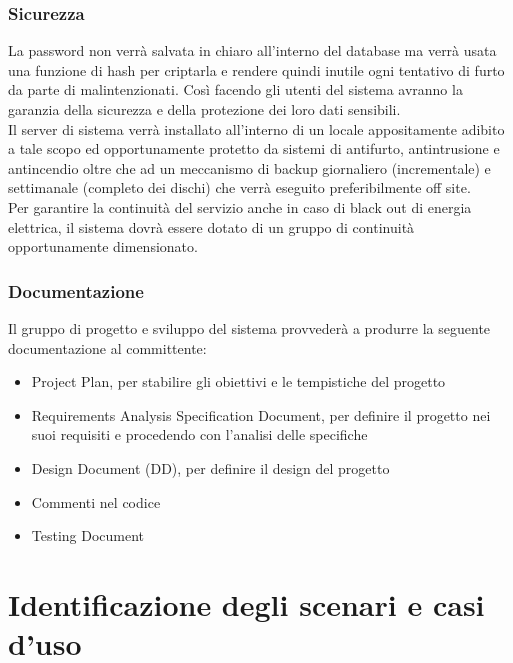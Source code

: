 \documentclass[a4paper,12pt]{article}
\begin{document}
\subsubsection{Sicurezza}
La password non verrà salvata in chiaro all'interno del database ma verrà usata una funzione di hash per criptarla e rendere quindi inutile ogni tentativo di furto da parte di malintenzionati. Così facendo gli utenti del sistema avranno la garanzia della sicurezza e della protezione dei loro dati sensibili. \\[1\baselineskip]
Il server di sistema verrà installato all'interno di un locale appositamente adibito a tale scopo ed opportunamente protetto da sistemi di antifurto, antintrusione e antincendio oltre che ad un meccanismo di backup giornaliero (incrementale) e settimanale (completo dei dischi) che verrà eseguito preferibilmente off site. \\[1\baselineskip]
Per garantire la continuità del servizio anche in caso di black out di energia elettrica, il sistema dovrà essere dotato di un gruppo di continuità opportunamente dimensionato.

\subsubsection{Documentazione}
Il gruppo di progetto e sviluppo del sistema provvederà a produrre la seguente documentazione al committente:
\begin{itemize}
\item Project Plan, per stabilire gli obiettivi e le tempistiche del progetto
\item Requirements Analysis Specification Document, per definire il progetto nei suoi requisiti e procedendo con l’analisi delle specifiche
\item Design Document (DD), per definire il design del progetto
\item Commenti nel codice
\item Testing Document
\end{itemize}
\clearpage

\section{Identificazione degli scenari e casi d'uso}
\end{document}
